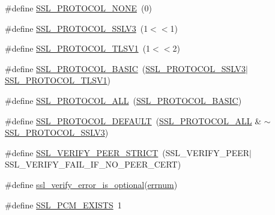 \begin{DoxyCompactItemize}
\item 
\#define \hyperlink{group__MOD__SSL__PRIVATE_gae75558450f8aa2c9e4538ad5145ceea3}{S\+S\+L\+\_\+\+P\+R\+O\+T\+O\+C\+O\+L\+\_\+\+N\+O\+NE}~(0)
\item 
\#define \hyperlink{group__MOD__SSL__PRIVATE_gaf8ef6ef492b323e333c77b02e878b654}{S\+S\+L\+\_\+\+P\+R\+O\+T\+O\+C\+O\+L\+\_\+\+S\+S\+L\+V3}~(1$<$$<$1)
\item 
\#define \hyperlink{group__MOD__SSL__PRIVATE_ga4dd8c8f7c8383d90d8a79bbc2ff96514}{S\+S\+L\+\_\+\+P\+R\+O\+T\+O\+C\+O\+L\+\_\+\+T\+L\+S\+V1}~(1$<$$<$2)
\item 
\#define \hyperlink{group__MOD__SSL__PRIVATE_ga69b03d2cbe2efbd8de2c6d6d4035776d}{S\+S\+L\+\_\+\+P\+R\+O\+T\+O\+C\+O\+L\+\_\+\+B\+A\+S\+IC}~(\hyperlink{group__MOD__SSL__PRIVATE_gaf8ef6ef492b323e333c77b02e878b654}{S\+S\+L\+\_\+\+P\+R\+O\+T\+O\+C\+O\+L\+\_\+\+S\+S\+L\+V3}$\vert$\hyperlink{group__MOD__SSL__PRIVATE_ga4dd8c8f7c8383d90d8a79bbc2ff96514}{S\+S\+L\+\_\+\+P\+R\+O\+T\+O\+C\+O\+L\+\_\+\+T\+L\+S\+V1})
\item 
\#define \hyperlink{group__MOD__SSL__PRIVATE_gad537c107026609e7b90f5b0ce2580a8b}{S\+S\+L\+\_\+\+P\+R\+O\+T\+O\+C\+O\+L\+\_\+\+A\+LL}~(\hyperlink{group__MOD__SSL__PRIVATE_ga69b03d2cbe2efbd8de2c6d6d4035776d}{S\+S\+L\+\_\+\+P\+R\+O\+T\+O\+C\+O\+L\+\_\+\+B\+A\+S\+IC})
\item 
\#define \hyperlink{group__MOD__SSL__PRIVATE_ga36010e1cc9b71336347d3c97f2d58e2d}{S\+S\+L\+\_\+\+P\+R\+O\+T\+O\+C\+O\+L\+\_\+\+D\+E\+F\+A\+U\+LT}~(\hyperlink{group__MOD__SSL__PRIVATE_gad537c107026609e7b90f5b0ce2580a8b}{S\+S\+L\+\_\+\+P\+R\+O\+T\+O\+C\+O\+L\+\_\+\+A\+LL} \& $\sim$\hyperlink{group__MOD__SSL__PRIVATE_gaf8ef6ef492b323e333c77b02e878b654}{S\+S\+L\+\_\+\+P\+R\+O\+T\+O\+C\+O\+L\+\_\+\+S\+S\+L\+V3})
\item 
\#define \hyperlink{group__MOD__SSL__PRIVATE_ga2c00d398501d86760ebb0cf64248c4c9}{S\+S\+L\+\_\+\+V\+E\+R\+I\+F\+Y\+\_\+\+P\+E\+E\+R\+\_\+\+S\+T\+R\+I\+CT}~(S\+S\+L\+\_\+\+V\+E\+R\+I\+F\+Y\+\_\+\+P\+E\+ER$\vert$S\+S\+L\+\_\+\+V\+E\+R\+I\+F\+Y\+\_\+\+F\+A\+I\+L\+\_\+\+I\+F\+\_\+\+N\+O\+\_\+\+P\+E\+E\+R\+\_\+\+C\+E\+RT)
\item 
\#define \hyperlink{group__MOD__SSL__PRIVATE_ga479773343fd970be23c26b9a354e0c51}{ssl\+\_\+verify\+\_\+error\+\_\+is\+\_\+optional}(\hyperlink{group__APR__Util__DBD_ga705b7ca7fb0a9700b61ad996d694a778}{errnum})
\item 
\#define \hyperlink{group__MOD__SSL__PRIVATE_gad2e4ca718c4947d62fae0d3c80391d98}{S\+S\+L\+\_\+\+P\+C\+M\+\_\+\+E\+X\+I\+S\+TS}~1

\end{DoxyCompactItemize}
